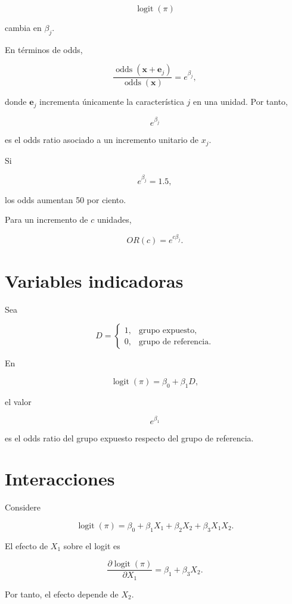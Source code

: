 \documentclass[
  spanish,
  11pt,
  letterpaper,
  DIV=11,
  numbers=noendperiod]{scrreprt}
\theoremstyle{definition}
\theoremstyle{plain}
\theoremstyle{definition}
\theoremstyle{remark}
\begin{document}
\[
\operatorname{logit}(\pi)
\]

cambia en \(\beta_j\).

En términos de odds,

\[
\frac{
\operatorname{odds}(\mathbf{x}+\mathbf{e}_j)
}{
\operatorname{odds}(\mathbf{x})
}
=
e^{\beta_j},
\]

donde \(\mathbf{e}_j\) incrementa únicamente la característica \(j\) en
una unidad. Por tanto,

\[
e^{\beta_j}
\]

es el odds ratio asociado a un incremento unitario de \(x_j\).

Si

\[
e^{\beta_j}=1.5,
\]

los odds aumentan 50 por ciento.

Para un incremento de \(c\) unidades,

\[
OR(c)=e^{c\beta_j}.
\]

\section{Variables indicadoras}\label{variables-indicadoras}

Sea

\[
D=
\begin{cases}
1, & \text{grupo expuesto},\\
0, & \text{grupo de referencia}.
\end{cases}
\]

En

\[
\operatorname{logit}(\pi)
=
\beta_0+\beta_1D,
\]

el valor

\[
e^{\beta_1}
\]

es el odds ratio del grupo expuesto respecto del grupo de referencia.

\section{Interacciones}\label{interacciones-1}

Considere

\[
\operatorname{logit}(\pi)
=
\beta_0+\beta_1X_1+\beta_2X_2+\beta_3X_1X_2.
\]

El efecto de \(X_1\) sobre el logit es

\[
\frac{\partial\operatorname{logit}(\pi)}
{\partial X_1}
=
\beta_1+\beta_3X_2.
\]

Por tanto, el efecto depende de \(X_2\).
\end{document}
